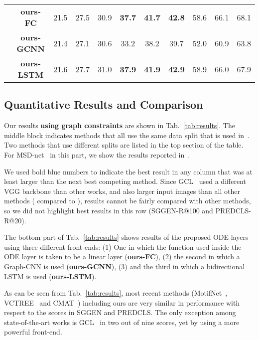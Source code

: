 \documentclass[runningheads]{llncs}
\begin{document}
\begin{table*}[!ht]
\begin{threeparttable}
\begin{tabular}{ccccccccccc}
\midrule
&\textbf{ours-FC}                      & 21.5 & 27.5 & 30.9 & {\color{blue} \textbf{37.7} } & {\color{blue} \textbf{41.7} } & {\color{blue} \textbf{42.8} } & 58.6 & 66.1 & 68.1 \\
&\textbf{ours-GCNN}                     & 21.4 & 27.1 & 30.6 & 33.2 & 38.2 & 39.7 & 52.0 & 60.9 & 63.8 \\
&\textbf{ours-LSTM}                      & 21.6 & 27.7 & 31.0 & {\color{blue} \textbf{37.9}} & {\color{blue} \textbf{41.9}} & {\color{blue} \textbf{42.9} } & 58.9 & 66.0 & 67.9 \\
\bottomrule
\end{tabular}
\end{threeparttable}
\end{table*}




\subsection{Quantitative Results and Comparison}
\label{subsec:results}


Our results \textbf{using graph constraints} are shown in Tab.~\ref{tab:results}. The middle block indicates methods that all use the same data split that is used in~\cite{xu2017scene}. Two methods that use different splits are listed in the top section of the table. For MSD-net~\cite{li2017scene} in this part, we show the results reported in~\cite{zellers2018neural}. 

We used bold blue numbers to indicate the best result in any column that was at least  larger than the next best competing method. 
Since GCL~\cite{Zhang2019:GCL} used a different VGG backbone than other works, and also larger input images than all other methods ( compared to ), results cannot be fairly compared with other methods, so we did not highlight best results in this row (SGGEN-R@100 and PREDCLS-R@20).

The bottom part of Tab.~\ref{tab:results} shows results of the proposed ODE layers using three different front-ends: (1) One in which the function used inside the ODE layer is taken to be a linear layer (\textbf{ours-FC}), (2) the second in which a Graph-CNN is used (\textbf{ours-GCNN}), (3) and the third in which a  bidirectional LSTM is used (\textbf{ours-LSTM}).

As can be seen from Tab.~\ref{tab:results}, most recent methods (MotifNet~\cite{zellers2018neural}, VCTREE~\cite{Tang_2019_CVPR} and CMAT~\cite{chen2019counterfactual}) including ours are very similar in performance with respect to the scores in SGGEN and PREDCLS. 
The only exception among state-of-the-art works is GCL~\cite{Zhang2019:GCL} in two out of nine scores, yet by using a more powerful front-end. 
\end{document}
